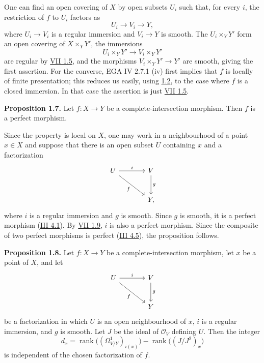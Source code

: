 One can find an open covering of $X$ by open subsets $U_i$ such that, for every $i$, the restriction of $f$ to $U_i$ factors as
\[
U_i\longrightarrow V_i\longrightarrow Y,
\]
where $U_i\to V_i$ is a regular immersion and $V_i\to Y$ is smooth. The $U_i\times_Y Y'$ form an open covering of $X\times_Y Y'$, the immersions
\[
U_i\times_Y Y'\longrightarrow V_i\times_Y Y'
\]
are regular by \hyperlink{sga6.e07.prop.1-5}{VII 1.5}, and the morphisms $V_i\times_Y Y'\to Y'$ are smooth, giving the first assertion. For the converse, EGA IV 2.7.1 (iv) first implies that $f$ is locally of finite presentation; this reduces us easily, using \hyperlink{sga6.e08.prop.1-2}{1.2}, to the case where $f$ is a closed immersion. In that case the assertion is just \hyperlink{sga6.e07.prop.1-5}{VII 1.5}.

\textbf{Proposition 1.7.} Let $f:X\to Y$ be a complete-intersection morphism. Then $f$ is a perfect morphism.

Since the property is local on $X$, one may work in a neighbourhood of a point $x\in X$ and suppose that there is an open subset $U$ containing $x$ and a factorization
\[
\begin{tikzcd}[column sep=large,row sep=large]
U \arrow[r,"i"] \arrow[dr,"f"'] & V \arrow[d,"g"]\\
& Y,
\end{tikzcd}
\]
where $i$ is a regular immersion and $g$ is smooth. Since $g$ is smooth, it is a perfect morphism (\hyperlink{sga6.e03.def.4-1}{III 4.1}). By \hyperlink{sga6.e07.prop.1-9}{VII 1.9}, $i$ is also a perfect morphism. Since the composite of two perfect morphisms is perfect (\hyperlink{sga6.e03.prop.4-5}{III 4.5}), the proposition follows.

\textbf{Proposition 1.8.} Let $f:X\to Y$ be a complete-intersection morphism, let $x$ be a point of $X$, and let
\[
\begin{tikzcd}[column sep=large,row sep=large]
U \arrow[r,"i"] \arrow[dr,"f"'] & V \arrow[d,"g"]\\
& Y
\end{tikzcd}
\]
be a factorization in which $U$ is an open neighbourhood of $x$, $i$ is a regular immersion, and $g$ is smooth. Let $J$ be the ideal of $\mathcal O_V$ defining $U$. Then the integer
\[
d_x=\operatorname{rank}\bigl((\Omega^1_{V/Y})_{i(x)}\bigr)-\operatorname{rank}\bigl((J/J^2)_x\bigr)
\]
is independent of the chosen factorization of $f$.


